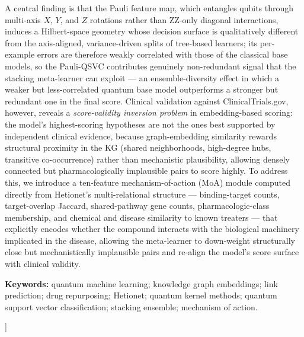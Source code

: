 \documentclass[twocolumn,10pt]{article}
\begin{document}
\begin{onecolabstract}
A central finding is that the Pauli feature map, which entangles qubits through multi-axis $X$, $Y$, and $Z$ rotations rather than ZZ-only diagonal interactions, induces a Hilbert-space geometry whose decision surface is qualitatively different from the axis-aligned, variance-driven splits of tree-based learners; its per-example errors are therefore weakly correlated with those of the classical base models, so the Pauli-QSVC contributes genuinely non-redundant signal that the stacking meta-learner can exploit --- an ensemble-diversity effect in which a weaker but less-correlated quantum base model outperforms a stronger but redundant one in the final score. Clinical validation against ClinicalTrials.gov, however, reveals a \textit{score-validity inversion problem} in embedding-based scoring: the model's highest-scoring hypotheses are not the ones best supported by independent clinical evidence, because graph-embedding similarity rewards structural proximity in the KG (shared neighborhoods, high-degree hubs, transitive co-occurrence) rather than mechanistic plausibility, allowing densely connected but pharmacologically implausible pairs to score highly. To address this, we introduce a ten-feature mechanism-of-action (MoA) module computed directly from Hetionet's multi-relational structure --- binding-target counts, target-overlap Jaccard, shared-pathway gene counts, pharmacologic-class membership, and chemical and disease similarity to known treaters --- that explicitly encodes whether the compound interacts with the biological machinery implicated in the disease, allowing the meta-learner to down-weight structurally close but mechanistically implausible pairs and re-align the model's score surface with clinical validity.
  \end{onecolabstract}
  \vspace{0.5em}
  {\small\noindent\textbf{Keywords:} quantum machine learning; knowledge graph embeddings; link prediction; drug repurposing; Hetionet; quantum kernel methods; quantum support vector classification; stacking ensemble; mechanism of action.\par}
  \vspace{1em}
]

\setcounter{footnote}{2}
\renewcommand{\thefootnote}{\arabic{footnote}}
\end{document}
